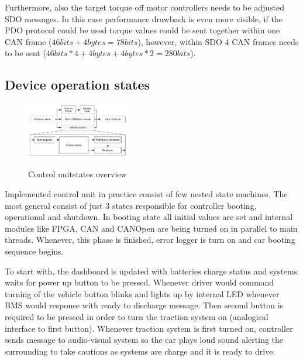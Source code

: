 Furthermore, also the target torque off motor controllers needs to be adjusted SDO messages. In this case performance drawback is even more visible, if the PDO protocol could be used torque values could be sent together within one CAN frame ($46bits+4bytes=78 bits$), however, within SDO 4 CAN frames needs to be sent ($46bits*4+4bytes+4bytes*2=280bits$).

\subsection{Device operation states}

\begin{figure}
    \vspace{-20pt}
    \begin{center}
        \includegraphics[width=0.4\textwidth]{figures/System_overview}
        \label{fig:sys_over}
        \caption{Control unit\newline states overview}
    \end{center}
    \vspace{-20pt}
\end{figure}

Implemented control unit in practice consist of few nested state machines. The most general consist of just 3 states responsible for controller booting, operational and shutdown.
In booting state all initial values are set and internal modules like FPGA, CAN and CANOpen are being turned on in parallel to main threads. Whenever, this phase is finished, error logger is turn on and car booting sequence begins.

To start with, the dashboard is updated with batteries charge status and systems waits for power up button to be pressed. Whenever driver would command turning of the vehicle button blinks and lights up by internal LED whenever BMS would response with ready to discharge message. Then second button is required to be pressed in order to turn the traction system on (analogical interface to first button). Whenever traction system is first turned on, controller sends message to audio-visual system so the car plays loud sound alerting the surrounding to take cautions as systems are charge and it is ready to drive.

